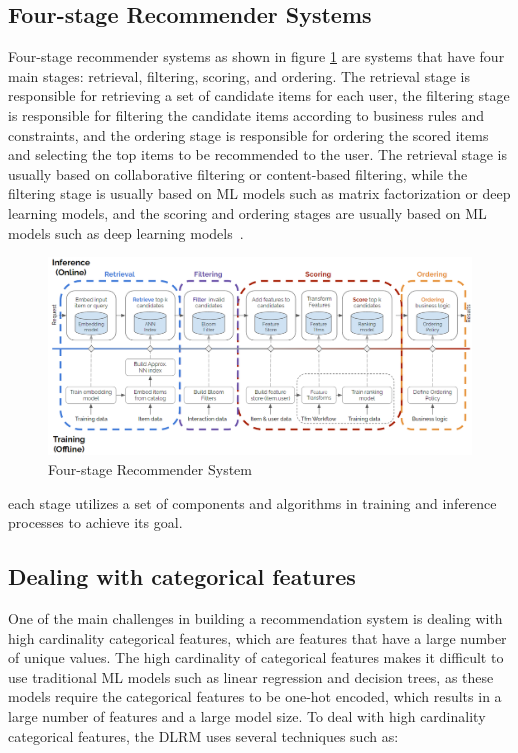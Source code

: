 \subsection{Four-stage Recommender Systems}
Four-stage recommender systems as shown in figure \ref{fig:FourStageRecSys} are systems that have four main stages: retrieval, filtering, scoring, and ordering. 
The retrieval stage is responsible for retrieving a set of candidate items for each user, 
the filtering stage is responsible for filtering the candidate items according to business rules and constraints,
and the ordering stage is responsible for ordering the scored items and selecting the top items to be recommended to the user. 
The retrieval stage is usually based on collaborative filtering or content-based filtering, while the filtering stage is 
usually based on ML models such as matrix factorization or deep learning models, and the scoring and ordering 
stages are usually based on ML models such as deep learning models~\cite{NvidiaRecSysBestPractices}.
\begin{figure}[H]
    \centering
    \includegraphics[width=1\textwidth]{assets/Four_stage_rec_sys.png}
    \caption[Four-stage Recommender System]{Four-stage Recommender System\cite{NvidiaRecSysBestPractices}}
    \label{fig:FourStageRecSys}
\end{figure}
each stage utilizes a set of components and algorithms in training and inference processes to achieve its goal.
\subsection{Dealing with categorical features}
One of the main challenges in building a recommendation system is dealing with high cardinality categorical features, which are features that have a large number of unique values. The high cardinality of categorical features makes it difficult to use traditional ML models such as linear regression and decision trees, as these models require the categorical features to be one-hot encoded, which results in a large number of features and a large model size. 
To deal with high cardinality categorical features, the DLRM uses several techniques such as:
